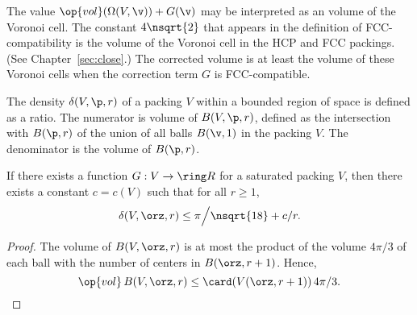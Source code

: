 \begin{cnl}
\begin{remark}
  The value $\op{vol}(\Omega(V,\v)) + G(\v)$ may be interpreted as an
   volume of the Voronoi cell. The constant
  $4\nsqrt{2}$ that appears in the definition of FCC-compatibility is
  the volume of the Voronoi cell in the HCP and FCC packings.  (See
  Chapter~\ref{sec:close}.)  The corrected volume is at least the
  volume of these Voronoi cells when the correction term $G$ is
  FCC-compatible.
%
%
\end{remark}

The density $\delta( V,\p,r)$ of a packing $ V$ within a bounded
region of space is defined as a ratio. The numerator is volume of
$\openBall{V}{\p,r}$, defined as the intersection with $\openBall{\p}{r}$ of the union
of all balls $\openBall{\v}{1}$ in the packing $V$.  The denominator is the volume of
$\openBall{\p}{r}$. 
%
%



\begin{lemma}
\label{lemma:reduction-finite-dimensions} %
% 
If there exists a 
 function $G: V\to\Real$ for
a saturated packing $ V$, then there exists a constant $c=c(V)$ such
that for all $r\ge1$,
\[  
\delta( V,\orz,r)
\le {\pi}\Big/{\nsqrt{18}} + c/r.
\] 
\end{lemma}


\begin{proof} 
The volume of $\openBall{ V}{\orz,r}$ is at most the product of the volume
$4\pi/3$ of each ball with the number of centers in
$\openBall{\orz}{r+1}$.  Hence,
\begin{equation} \label{eqn:Abound}
\op{vol}\, \openBall{ V}{\orz,r} \le \card( \Vee{V}(\orz,r+1))\, 4\pi/3.
\end{equation}



\end{proof}
\end{cnl}
